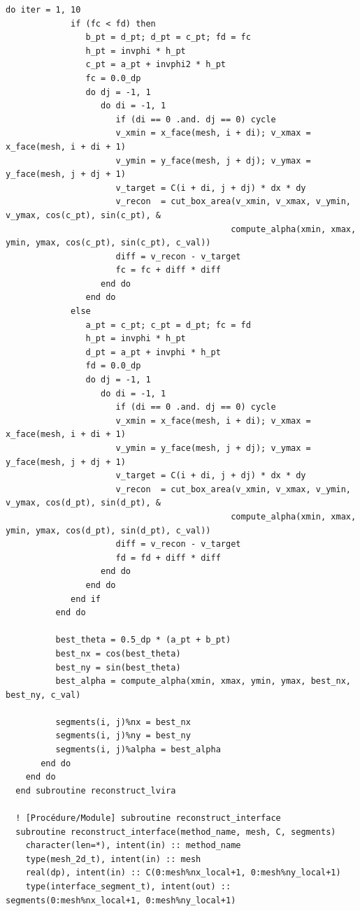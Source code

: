 \documentclass[10pt,a4paper,oneside]{book}
\begin{document}
\begin{lstlisting}[language={[95]Fortran}]
          do iter = 1, 10
             if (fc < fd) then
                b_pt = d_pt; d_pt = c_pt; fd = fc
                h_pt = invphi * h_pt
                c_pt = a_pt + invphi2 * h_pt
                fc = 0.0_dp
                do dj = -1, 1
                   do di = -1, 1
                      if (di == 0 .and. dj == 0) cycle
                      v_xmin = x_face(mesh, i + di); v_xmax = x_face(mesh, i + di + 1)
                      v_ymin = y_face(mesh, j + dj); v_ymax = y_face(mesh, j + dj + 1)
                      v_target = C(i + di, j + dj) * dx * dy
                      v_recon  = cut_box_area(v_xmin, v_xmax, v_ymin, v_ymax, cos(c_pt), sin(c_pt), &
                                             compute_alpha(xmin, xmax, ymin, ymax, cos(c_pt), sin(c_pt), c_val))
                      diff = v_recon - v_target
                      fc = fc + diff * diff
                   end do
                end do
             else
                a_pt = c_pt; c_pt = d_pt; fc = fd
                h_pt = invphi * h_pt
                d_pt = a_pt + invphi * h_pt
                fd = 0.0_dp
                do dj = -1, 1
                   do di = -1, 1
                      if (di == 0 .and. dj == 0) cycle
                      v_xmin = x_face(mesh, i + di); v_xmax = x_face(mesh, i + di + 1)
                      v_ymin = y_face(mesh, j + dj); v_ymax = y_face(mesh, j + dj + 1)
                      v_target = C(i + di, j + dj) * dx * dy
                      v_recon  = cut_box_area(v_xmin, v_xmax, v_ymin, v_ymax, cos(d_pt), sin(d_pt), &
                                             compute_alpha(xmin, xmax, ymin, ymax, cos(d_pt), sin(d_pt), c_val))
                      diff = v_recon - v_target
                      fd = fd + diff * diff
                   end do
                end do
             end if
          end do

          best_theta = 0.5_dp * (a_pt + b_pt)
          best_nx = cos(best_theta)
          best_ny = sin(best_theta)
          best_alpha = compute_alpha(xmin, xmax, ymin, ymax, best_nx, best_ny, c_val)

          segments(i, j)%nx = best_nx
          segments(i, j)%ny = best_ny
          segments(i, j)%alpha = best_alpha
       end do
    end do
  end subroutine reconstruct_lvira

  ! [Procédure/Module] subroutine reconstruct_interface
  subroutine reconstruct_interface(method_name, mesh, C, segments)
    character(len=*), intent(in) :: method_name
    type(mesh_2d_t), intent(in) :: mesh
    real(dp), intent(in) :: C(0:mesh%nx_local+1, 0:mesh%ny_local+1)
    type(interface_segment_t), intent(out) :: segments(0:mesh%nx_local+1, 0:mesh%ny_local+1)


\end{lstlisting}
\end{document}
